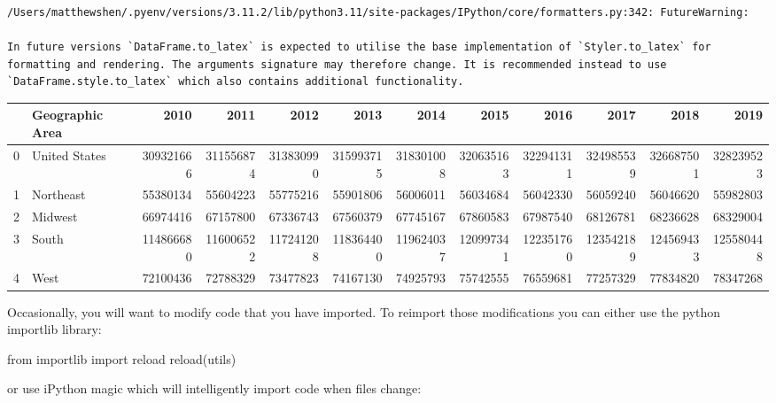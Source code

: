 \documentclass[
  letterpaper,
  DIV=11,
  numbers=noendperiod]{scrreprt}
\newenvironment{Shaded}{\begin{snugshade}}{\end{snugshade}}
\newcommand{\BuiltInTok}[1]{\textcolor[rgb]{0.00,0.23,0.31}{#1}}
\newcommand{\ImportTok}[1]{\textcolor[rgb]{0.00,0.46,0.62}{#1}}
\newcommand{\NormalTok}[1]{\textcolor[rgb]{0.00,0.23,0.31}{#1}}
\begin{document}
\begin{verbatim}
/Users/matthewshen/.pyenv/versions/3.11.2/lib/python3.11/site-packages/IPython/core/formatters.py:342: FutureWarning:

In future versions `DataFrame.to_latex` is expected to utilise the base implementation of `Styler.to_latex` for formatting and rendering. The arguments signature may therefore change. It is recommended instead to use `DataFrame.style.to_latex` which also contains additional functionality.
\end{verbatim}

\begin{tabular}{llrrrrrrrrrr}
\toprule
{} & Geographic Area &       2010 &       2011 &       2012 &       2013 &       2014 &       2015 &       2016 &       2017 &       2018 &       2019 \\
\midrule
0 &   United States &  309321666 &  311556874 &  313830990 &  315993715 &  318301008 &  320635163 &  322941311 &  324985539 &  326687501 &  328239523 \\
1 &       Northeast &   55380134 &   55604223 &   55775216 &   55901806 &   56006011 &   56034684 &   56042330 &   56059240 &   56046620 &   55982803 \\
2 &         Midwest &   66974416 &   67157800 &   67336743 &   67560379 &   67745167 &   67860583 &   67987540 &   68126781 &   68236628 &   68329004 \\
3 &           South &  114866680 &  116006522 &  117241208 &  118364400 &  119624037 &  120997341 &  122351760 &  123542189 &  124569433 &  125580448 \\
4 &            West &   72100436 &   72788329 &   73477823 &   74167130 &   74925793 &   75742555 &   76559681 &   77257329 &   77834820 &   78347268 \\
\bottomrule
\end{tabular}

Occasionally, you will want to modify code that you have imported. To
reimport those modifications you can either use the python importlib
library:

\begin{Shaded}
\begin{Highlighting}[]
\ImportTok{from}\NormalTok{ importlib }\ImportTok{import} \BuiltInTok{reload}
\BuiltInTok{reload}\NormalTok{(utils)}
\end{Highlighting}
\end{Shaded}

or use iPython magic which will intelligently import code when files
change:
\end{document}
